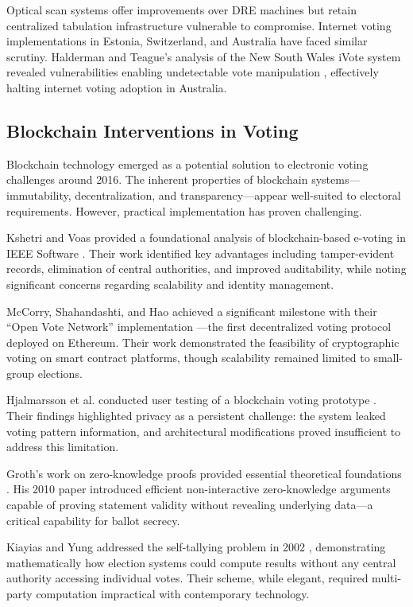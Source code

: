 \documentclass[conference]{IEEEtran}
\begin{document}
Optical scan systems offer improvements over DRE machines but retain centralized tabulation infrastructure vulnerable to compromise. Internet voting implementations in Estonia, Switzerland, and Australia have faced similar scrutiny. Halderman and Teague's analysis of the New South Wales iVote system revealed vulnerabilities enabling undetectable vote manipulation \cite{internet_voting}, effectively halting internet voting adoption in Australia.

\subsection{Blockchain Interventions in Voting}
Blockchain technology emerged as a potential solution to electronic voting challenges around 2016. The inherent properties of blockchain systems---immutability, decentralization, and transparency---appear well-suited to electoral requirements. However, practical implementation has proven challenging.

Kshetri and Voas provided a foundational analysis of blockchain-based e-voting in IEEE Software \cite{kshetri2018blockchain}. Their work identified key advantages including tamper-evident records, elimination of central authorities, and improved auditability, while noting significant concerns regarding scalability and identity management.

McCorry, Shahandashti, and Hao achieved a significant milestone with their ``Open Vote Network'' implementation \cite{mccorry2017smart}---the first decentralized voting protocol deployed on Ethereum. Their work demonstrated the feasibility of cryptographic voting on smart contract platforms, though scalability remained limited to small-group elections.

Hjalmarsson et al. conducted user testing of a blockchain voting prototype \cite{hjalmarsson2018blockchain}. Their findings highlighted privacy as a persistent challenge: the system leaked voting pattern information, and architectural modifications proved insufficient to address this limitation.

Groth's work on zero-knowledge proofs provided essential theoretical foundations \cite{zkp_voting}. His 2010 paper introduced efficient non-interactive zero-knowledge arguments capable of proving statement validity without revealing underlying data---a critical capability for ballot secrecy.

Kiayias and Yung addressed the self-tallying problem in 2002 \cite{voting_security}, demonstrating mathematically how election systems could compute results without any central authority accessing individual votes. Their scheme, while elegant, required multi-party computation impractical with contemporary technology.
\end{document}
